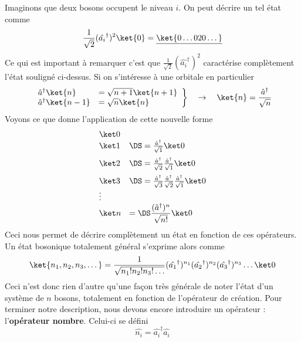 Imaginons que deux bosons occupent le niveau $i$. On peut décrire un tel état comme
\begin{equation}
\frac{1}{\sqrt{2}}(\hat{a_i}^\dagger)^2\ket{0}=\underline{\ket{0\dots 020\dots}}
\end{equation}
Ce qui est important à remarquer c'est que $\frac{1}{\sqrt{2}}(\hat{a_i}^\dagger)^2$ 
caractérise complètement l'état souligné ci-dessus. Si on s'intéresse à une orbitale en 
particulier 
\begin{equation}
\left.\begin{array}{ll}
\hat{a}^\dagger\ket{n} &= \sqrt{n+1}\ket{n+1}\\
\hat{a}^\dagger\ket{n-1} &= \sqrt{n}\ket{n}
\end{array}\right\}\quad\rightarrow\quad \ket{n} =\frac{\hat{a}^\dagger}{\sqrt{n}}
\end{equation}
Voyons ce que donne l'application de cette nouvelle forme
\begin{equation}
\begin{array}{ll}
\ket 0&\\
\ket 1&\DS= \frac{\hat{a}^\dagger}{\sqrt{1}}\ket 0\vspace{2mm}\\
\ket 2&\DS= \frac{\hat{a}^\dagger}{\sqrt{2}}\frac{\hat{a}^\dagger}{\sqrt{1}}\ket 0\vspace{2mm}\\
\ket 3&\DS= \frac{\hat{a}^\dagger}{\sqrt{3}}\frac{\hat{a}^\dagger}{\sqrt{2}}\frac{\hat{a}^\dagger}{\sqrt{1}}\ket 0\\
\vdots&\\
\ket n &=\DS \dfrac{(\hat{a}^\dagger)^n}{\sqrt{n!}}\ket0
\end{array}
\end{equation}
Ceci nous permet de décrire complètement un état en fonction de ces opérateurs. Un état bosonique totalement général 
s'exprime alors comme
\begin{equation}
\ket{n_1, n_2, n_3,\dots} = \dfrac{1}{\sqrt{n_1!n_2!n_3!\dots}}(\hat{a_1}^\dagger)^{n_1}(\hat{a_2}^\dagger)^{n_2}
(\hat{a_3}^\dagger)^{n_3}\dots\ket0
\end{equation}
Ceci n'est donc rien d'autre qu'une façon très générale de noter l'état d'un système de $n$ bosons, totalement en 
fonction de l'opérateur de création. Pour terminer notre description, nous devons encore introduire un opérateur :
l'\textbf{opérateur nombre}. Celui-ci se défini
\begin{equation}
\hat{n_i}=\hat{a_i}^\dagger\hat{a_i}
\end{equation}
